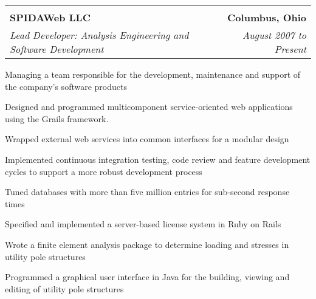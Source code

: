 \begin{tabular*}{6.6in}{@{\extracolsep{\fill}}lr}
\vspace{-3mm} & \\
\textbf{SPIDAWeb LLC} & \textbf{Columbus, Ohio}\\
\textit{Lead Developer: Analysis Engineering and Software Development} & \textit{August 2007 to Present}\\
\end{tabular*}
\begin{compactitem} 
\item Managing a team responsible for the development, maintenance and support of the company's software products
\item Designed and programmed multicomponent service-oriented web applications using the Grails framework.
\item Wrapped external web services into common interfaces for a modular design
\item Implemented continuous integration testing, code review and feature development cycles to support a more robust development process
\item Tuned databases with more than five million entries for sub-second response times
\item Specified and implemented a server-based license system in Ruby on Rails
\item Wrote a finite element analysis package to determine loading and stresses in utility pole structures 
\item Programmed a graphical user interface in Java for the building, viewing and editing of utility pole structures\medskip
\end{compactitem}


